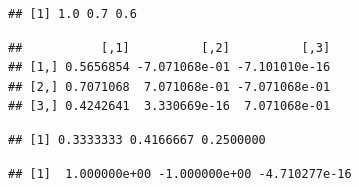 \documentclass[
]{book}
\newenvironment{Shaded}{\begin{snugshade}}{\end{snugshade}}
\newcommand{\DecValTok}[1]{\textcolor[rgb]{0.00,0.00,0.81}{#1}}
\newcommand{\KeywordTok}[1]{\textcolor[rgb]{0.13,0.29,0.53}{\textbf{#1}}}
\newcommand{\NormalTok}[1]{#1}
\newcommand{\OperatorTok}[1]{\textcolor[rgb]{0.81,0.36,0.00}{\textbf{#1}}}
\newcommand{\StringTok}[1]{\textcolor[rgb]{0.31,0.60,0.02}{#1}}
\theoremstyle{definition}
\theoremstyle{definition}
\theoremstyle{definition}
\theoremstyle{remark}
\begin{document}
\begin{verbatim}
## [1] 1.0 0.7 0.6
\end{verbatim}

\begin{Shaded}
\end{Shaded}

\begin{verbatim}
##           [,1]          [,2]          [,3]
## [1,] 0.5656854 -7.071068e-01 -7.101010e-16
## [2,] 0.7071068  7.071068e-01 -7.071068e-01
## [3,] 0.4242641  3.330669e-16  7.071068e-01
\end{verbatim}

\begin{Shaded}
\end{Shaded}

\begin{verbatim}
## [1] 0.3333333 0.4166667 0.2500000
\end{verbatim}

\begin{Shaded}
\end{Shaded}

\begin{verbatim}
## [1]  1.000000e+00 -1.000000e+00 -4.710277e-16
\end{verbatim}

\begin{Shaded}
\end{Shaded}
\end{document}
